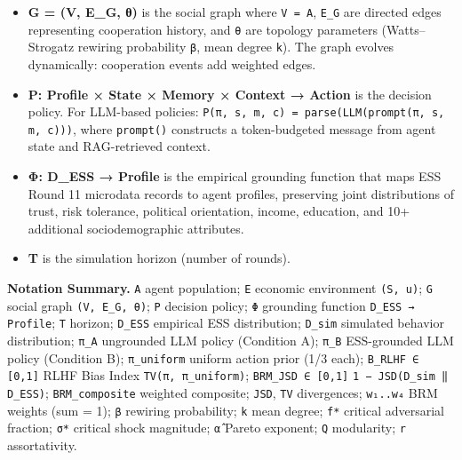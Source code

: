 \begin{itemize}
\item \textbf{G = (V, E\_G, θ)} is the social graph where \texttt{V = A}, \texttt{E\_G} are directed edges representing cooperation history, and \texttt{θ} are topology parameters (Watts–Strogatz rewiring probability \texttt{β}, mean degree \texttt{k}). The graph evolves dynamically: cooperation events add weighted edges.
\end{itemize}

\begin{itemize}
\item \textbf{P: Profile × State × Memory × Context → Action} is the decision policy. For LLM-based policies: \texttt{P(π, s, m, c) = parse(LLM(prompt(π, s, m, c)))}, where \texttt{prompt()} constructs a token-budgeted message from agent state and RAG-retrieved context.
\end{itemize}

\begin{itemize}
\item \textbf{Φ: D\_ESS → Profile} is the empirical grounding function that maps ESS Round 11 microdata records to agent profiles, preserving joint distributions of trust, risk tolerance, political orientation, income, education, and 10+ additional sociodemographic attributes.
\end{itemize}

\begin{itemize}
\item \textbf{T} is the simulation horizon (number of rounds).
\end{itemize}

\textbf{Notation Summary.} \texttt{A} agent population; \texttt{E} economic environment \texttt{(S, u)}; \texttt{G} social graph \texttt{(V, E\_G, θ)}; \texttt{P} decision policy; \texttt{Φ} grounding function \texttt{D\_ESS → Profile}; \texttt{T} horizon; \texttt{D\_ESS} empirical ESS distribution; \texttt{D\_sim} simulated behavior distribution; \texttt{π\_A} ungrounded LLM policy (Condition A); \texttt{π\_B} ESS-grounded LLM policy (Condition B); \texttt{π\_uniform} uniform action prior (1/3 each); \texttt{B\_RLHF ∈ [0,1]} RLHF Bias Index \texttt{TV(π, π\_uniform)}; \texttt{BRM\_JSD ∈ [0,1]} \texttt{1 − JSD(D\_sim ‖ D\_ESS)}; \texttt{BRM\_composite} weighted composite; \texttt{JSD}, \texttt{TV} divergences; \texttt{w₁..w₄} BRM weights (sum = 1); \texttt{β} rewiring probability; \texttt{k} mean degree; \texttt{f*} critical adversarial fraction; \texttt{σ*} critical shock magnitude; \texttt{α̂} Pareto exponent; \texttt{Q} modularity; \texttt{r} assortativity.

